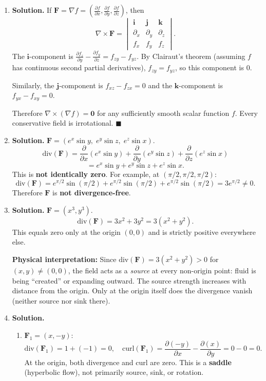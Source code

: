 \begin{enumerate}
\item \textbf{Solution.}
If $\mathbf{F}=\nabla f = \left(\frac{\partial f}{\partial x},\frac{\partial f}{\partial y},\frac{\partial f}{\partial z}\right)$, then
\[
\nabla\times\mathbf{F} = \begin{vmatrix}\mathbf{i}&\mathbf{j}&\mathbf{k}\\ \partial_x&\partial_y&\partial_z\\ f_x & f_y & f_z\end{vmatrix}.
\]
The $\mathbf{i}$-component is $\frac{\partial f_z}{\partial y}-\frac{\partial f_y}{\partial z} = f_{zy}-f_{yz}$. By Clairaut's theorem (assuming $f$ has continuous second partial derivatives), $f_{zy}=f_{yz}$, so this component is $0$.

Similarly, the $\mathbf{j}$-component is $f_{xz}-f_{zx}=0$ and the $\mathbf{k}$-component is $f_{yx}-f_{xy}=0$.

Therefore $\nabla\times(\nabla f) = \mathbf{0}$ for any sufficiently smooth scalar function $f$. Every conservative field is irrotational. $\blacksquare$

\item \textbf{Solution.}
$\mathbf{F}=(e^x\sin y,\;e^y\sin z,\;e^z\sin x)$.
\[
\text{div}(\mathbf{F}) = \frac{\partial}{\partial x}(e^x\sin y)+\frac{\partial}{\partial y}(e^y\sin z)+\frac{\partial}{\partial z}(e^z\sin x)
\]
\[
= e^x\sin y + e^y\sin z + e^z\sin x.
\]
This is \textbf{not identically zero}. For example, at $(\pi/2, \pi/2, \pi/2)$:
\[
\text{div}(\mathbf{F}) = e^{\pi/2}\sin(\pi/2)+e^{\pi/2}\sin(\pi/2)+e^{\pi/2}\sin(\pi/2) = 3e^{\pi/2}\neq 0.
\]
Therefore $\mathbf{F}$ is \textbf{not divergence-free}.

\item \textbf{Solution.}
$\mathbf{F}=(x^3, y^3)$.
\[
\text{div}(\mathbf{F}) = 3x^2 + 3y^2 = 3(x^2+y^2).
\]
This equals zero only at the origin $(0,0)$ and is strictly positive everywhere else.

\textbf{Physical interpretation:} Since $\text{div}(\mathbf{F})=3(x^2+y^2)>0$ for $(x,y)\neq(0,0)$, the field acts as a \emph{source} at every non-origin point: fluid is being ``created'' or expanding outward. The source strength increases with distance from the origin. Only at the origin itself does the divergence vanish (neither source nor sink there).

\item \textbf{Solution.}
\begin{enumerate}
\item $\mathbf{F}_1=(x,-y)$:
\[
\text{div}(\mathbf{F}_1)=1+(-1)=0, \quad \text{curl}(\mathbf{F}_1)=\frac{\partial(-y)}{\partial x}-\frac{\partial(x)}{\partial y}=0-0=0.
\]
At the origin, both divergence and curl are zero. This is a \textbf{saddle} (hyperbolic flow), not primarily source, sink, or rotation.


\end{enumerate}
\end{enumerate}
